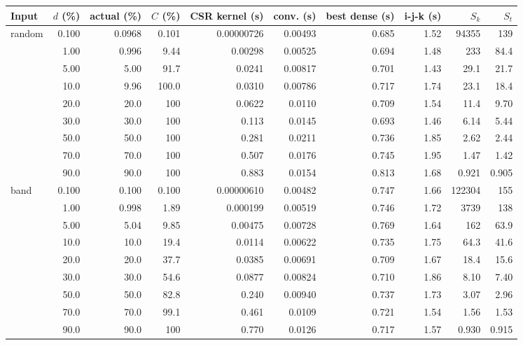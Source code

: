\begin{tabular}{lrrrrrrrrr}
\toprule
Input & $d$ (\%) & actual (\%) & $C$ (\%) & CSR kernel (s) & conv. (s) & best dense (s) & i-j-k (s) & $S_k$ & $S_t$ \\
\midrule
random & 0.100 & 0.0968 & 0.101 & 0.00000726 & 0.00493 & 0.685 & 1.52 & 94355 & 139 \\
 & 1.00 & 0.996 & 9.44 & 0.00298 & 0.00525 & 0.694 & 1.48 & 233 & 84.4 \\
 & 5.00 & 5.00 & 91.7 & 0.0241 & 0.00817 & 0.701 & 1.43 & 29.1 & 21.7 \\
 & 10.0 & 9.96 & 100.0 & 0.0310 & 0.00786 & 0.717 & 1.74 & 23.1 & 18.4 \\
 & 20.0 & 20.0 & 100 & 0.0622 & 0.0110 & 0.709 & 1.54 & 11.4 & 9.70 \\
 & 30.0 & 30.0 & 100 & 0.113 & 0.0145 & 0.693 & 1.46 & 6.14 & 5.44 \\
 & 50.0 & 50.0 & 100 & 0.281 & 0.0211 & 0.736 & 1.85 & 2.62 & 2.44 \\
 & 70.0 & 70.0 & 100 & 0.507 & 0.0176 & 0.745 & 1.95 & 1.47 & 1.42 \\
 & 90.0 & 90.0 & 100 & 0.883 & 0.0154 & 0.813 & 1.68 & 0.921 & 0.905 \\
\midrule
band & 0.100 & 0.100 & 0.100 & 0.00000610 & 0.00482 & 0.747 & 1.66 & 122304 & 155 \\
 & 1.00 & 0.998 & 1.89 & 0.000199 & 0.00519 & 0.746 & 1.72 & 3739 & 138 \\
 & 5.00 & 5.04 & 9.85 & 0.00475 & 0.00728 & 0.769 & 1.64 & 162 & 63.9 \\
 & 10.0 & 10.0 & 19.4 & 0.0114 & 0.00622 & 0.735 & 1.75 & 64.3 & 41.6 \\
 & 20.0 & 20.0 & 37.7 & 0.0385 & 0.00691 & 0.709 & 1.67 & 18.4 & 15.6 \\
 & 30.0 & 30.0 & 54.6 & 0.0877 & 0.00824 & 0.710 & 1.86 & 8.10 & 7.40 \\
 & 50.0 & 50.0 & 82.8 & 0.240 & 0.00940 & 0.737 & 1.73 & 3.07 & 2.96 \\
 & 70.0 & 70.0 & 99.1 & 0.461 & 0.0109 & 0.721 & 1.54 & 1.56 & 1.53 \\
 & 90.0 & 90.0 & 100 & 0.770 & 0.0126 & 0.717 & 1.57 & 0.930 & 0.915 \\
\bottomrule
\end{tabular}
